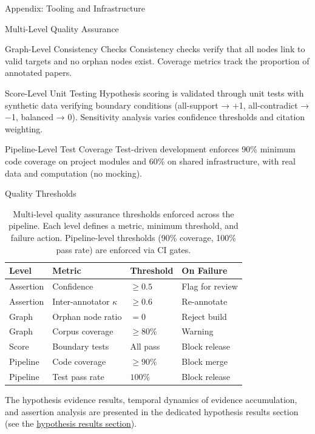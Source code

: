 \documentclass[
  ignorenonframetext,
]{beamer}
\begin{document}
\begin{frame}[fragile]{Appendix: Tooling and Infrastructure
\label{sec:tooling}}
\begin{block}{Multi-Level Quality Assurance}
\begin{block}{Graph-Level Consistency Checks}
\protect{}\label{graph-level-consistency-checks}
Consistency checks verify that all nodes link to valid targets and no
orphan nodes exist. Coverage metrics track the proportion of annotated
papers.
\end{block}

\begin{block}{Score-Level Unit Testing}
\protect{}\label{score-level-unit-testing}
Hypothesis scoring is validated through unit tests with synthetic data
verifying boundary conditions (all-support → +1, all-contradict → −1,
balanced → 0). Sensitivity analysis varies confidence thresholds and
citation weighting.
\end{block}

\begin{block}{Pipeline-Level Test Coverage}
\protect{}\label{pipeline-level-test-coverage}
Test-driven development enforces 90\% minimum code coverage on project
modules and 60\% on shared infrastructure, with real data and
computation (no mocking).
\end{block}

\begin{block}{Quality Thresholds}
\protect{}\label{quality-thresholds}
\begin{table}[htbp]
\centering
\caption{Multi-level quality assurance thresholds enforced across the pipeline. Each level defines a metric, minimum threshold, and failure action. Pipeline-level thresholds (90\% coverage, 100\% pass rate) are enforced via CI gates.}
\label{tab:quality_thresholds}
\begin{tabular}{llll}
\toprule
\textbf{Level} & \textbf{Metric} & \textbf{Threshold} & \textbf{On Failure} \\
\midrule
Assertion & Confidence & $\geq 0.5$ & Flag for review \\
Assertion & Inter-annotator $\kappa$ & $\geq 0.6$ & Re-annotate \\
Graph & Orphan node ratio & $= 0$ & Reject build \\
Graph & Corpus coverage & $\geq 80\%$ & Warning \\
Score & Boundary tests & All pass & Block release \\
Pipeline & Code coverage & $\geq 90\%$ & Block merge \\
Pipeline & Test pass rate & $100\%$ & Block release \\
\bottomrule
\end{tabular}
\end{table}

The hypothesis evidence results, temporal dynamics of evidence
accumulation, and assertion analysis are presented in the dedicated
hypothesis results section (see the
\hyperref[sec:hypothesis_results]{hypothesis results section}).
\end{block}
\end{block}
\end{frame}
\end{document}
